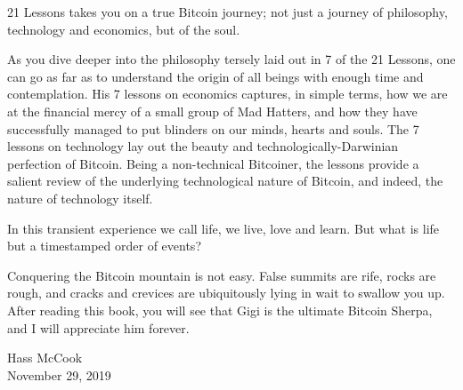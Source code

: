 21 Lessons takes you on a true Bitcoin journey; not just a journey of
philosophy, technology and economics, but of the soul.

As you dive deeper into the philosophy tersely laid out in 7 of the 21 Lessons,
one can go as far as to understand the origin of all beings with enough time and
contemplation. His 7 lessons on economics captures, in simple terms, how we are
at the financial mercy of a small group of Mad Hatters, and how they have
successfully managed to put blinders on our minds, hearts and souls. The 7
lessons on technology lay out the beauty and technologically-Darwinian
perfection of Bitcoin. Being a non-technical Bitcoiner, the lessons provide a
salient review of the underlying technological nature of Bitcoin, and indeed,
the nature of technology itself.

In this transient experience we call life, we live, love and learn. But what is
life but a timestamped order of events?

Conquering the Bitcoin mountain is not easy. False summits are rife, rocks are
rough, and cracks and crevices are ubiquitously lying in wait to swallow you up.
After reading this book, you will see that Gigi is the ultimate Bitcoin Sherpa,
and I will appreciate him forever.

\begin{flushright}
  Hass McCook \\
  November 29, 2019
\end{flushright}
